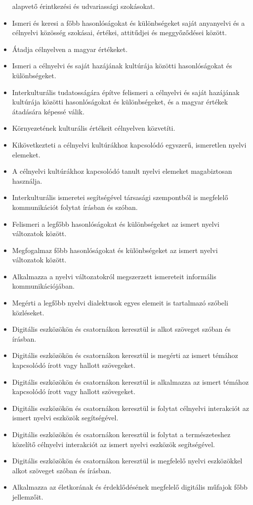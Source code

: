 \begin{itemize}
  alapvető érintkezési és udvariassági szokásokat.
\item
  Ismeri és keresi a főbb hasonlóságokat és különbségeket saját
  anyanyelvi és a célnyelvi közösség szokásai, értékei, attitűdjei és
  meggyőződései között.
\item
  Átadja célnyelven a magyar értékeket.
\item
  Ismeri a célnyelvi és saját hazájának kultúrája közötti hasonlóságokat
  és különbségeket.
\item
  Interkulturális tudatosságára építve felismeri a célnyelvi és saját
  hazájának kultúrája közötti hasonlóságokat és különbségeket, és a
  magyar értékek átadására képessé válik.
\item
  Környezetének kulturális értékeit célnyelven közvetíti.
\item
  Kikövetkezteti a célnyelvi kultúrákhoz kapcsolódó egyszerű, ismeretlen
  nyelvi elemeket.
\item
  A célnyelvi kultúrákhoz kapcsolódó tanult nyelvi elemeket magabiztosan
  használja.
\item
  Interkulturális ismeretei segítségével társasági szempontból is
  megfelelő kommunikációt folytat írásban és szóban.
\item
  Felismeri a legfőbb hasonlóságokat és különbségeket az ismert nyelvi
  változatok között.
\item
  Megfogalmaz főbb hasonlóságokat és különbségeket az ismert nyelvi
  változatok között.
\item
  Alkalmazza a nyelvi változatokról megszerzett ismereteit informális
  kommunikációjában.
\item
  Megérti a legfőbb nyelvi dialektusok egyes elemeit is tartalmazó
  szóbeli közléseket.
\item
  Digitális eszközökön és csatornákon keresztül is alkot szöveget szóban
  és írásban.
\item
  Digitális eszközökön és csatornákon keresztül is megérti az ismert
  témához kapcsolódó írott vagy hallott szövegeket.
\item
  Digitális eszközökön és csatornákon keresztül is alkalmazza az ismert
  témához kapcsolódó írott vagy hallott szövegeket.
\item
  Digitális eszközökön és csatornákon keresztül is folytat célnyelvi
  interakciót az ismert nyelvi eszközök segítségével.
\item
  Digitális eszközökön és csatornákon keresztül is folytat a
  természeteshez közelítő célnyelvi interakciót az ismert nyelvi
  eszközök segítségével.
\item
  Digitális eszközökön és csatornákon keresztül is megfelelő nyelvi
  eszközökkel alkot szöveget szóban és írásban.
\item
  Alkalmazza az életkorának és érdeklődésének megfelelő digitális
  műfajok főbb jellemzőit.
\end{itemize}

